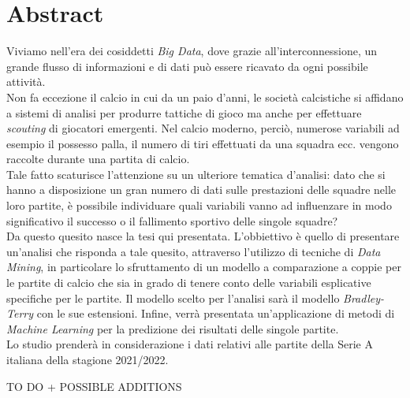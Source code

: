 
\cleardoublepage
{}
{}
\begingroup
\let\clearpage\relax
\let\cleardoublepage\relax
\let\cleardoublepage\relax

\chapter*{Abstract}

Viviamo nell'era dei cosiddetti \emph{Big Data}, dove grazie all'interconnessione, un grande flusso di informazioni e di dati può essere ricavato da ogni possibile attività. \\
Non fa eccezione il calcio in cui da un paio d'anni, le società calcistiche si affidano a sistemi di analisi per produrre tattiche di gioco ma anche per effettuare \textit{scouting} di giocatori emergenti. Nel calcio moderno, perciò, numerose variabili ad esempio il possesso palla, il numero di tiri effettuati da una squadra ecc. vengono raccolte durante una partita di calcio.\\
Tale fatto scaturisce l'attenzione su un ulteriore tematica d'analisi: dato che si hanno a disposizione un gran numero di dati sulle prestazioni delle squadre nelle loro partite, è possibile individuare quali variabili vanno ad influenzare in modo significativo il successo o il fallimento sportivo delle singole squadre? \\
Da questo quesito nasce la tesi qui presentata. L’obbiettivo è quello di presentare un'analisi che risponda a tale quesito, attraverso l'utilizzo di tecniche di \textit{Data Mining}, in particolare lo sfruttamento di un modello a comparazione a coppie per le partite di calcio che sia in grado di tenere conto delle variabili esplicative specifiche per le partite. Il modello scelto per l’analisi sarà il modello \emph{Bradley-Terry} con le sue estensioni. Infine, verrà presentata un’applicazione di metodi di \textit{Machine Learning} per la predizione dei risultati delle singole partite. \\
Lo studio prenderà in considerazione i dati relativi alle partite della Serie A italiana della stagione 2021/2022.

TO DO + POSSIBLE ADDITIONS






%
%

\endgroup			

\vfill


